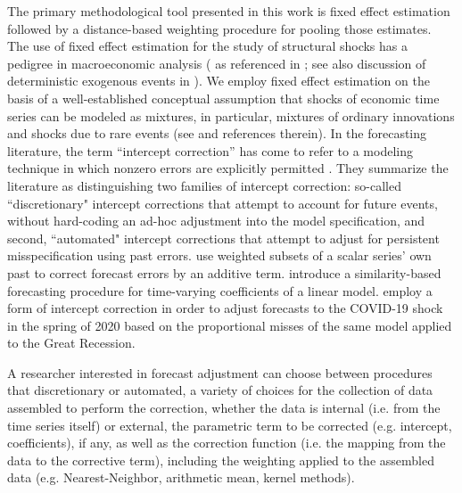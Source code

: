 \documentclass{uiucthesis2021}
\theoremstyle{definition}
\begin{document}
The primary methodological tool presented in this work is fixed effect estimation followed by a distance-based weighting procedure for pooling those estimates.  The use of fixed effect estimation for the study of structural shocks has a pedigree in macroeconomic analysis (\cite[][]{romer1989does} as referenced in \cite[][]{kilian2017structural}; see also discussion of deterministic exogenous events in \cite[][]{engle2001good}).  We employ fixed effect estimation on the basis of a well-established conceptual assumption that shocks of economic time series can be modeled as mixtures, in particular, mixtures of ordinary innovations and shocks due to rare events (see \cite[][]{phillips1996forecasting} and references therein).  In the forecasting literature, the term ``intercept correction'' has come to refer to a modeling technique in which nonzero errors are explicitly permitted \parencite[][]{hendry1994theory, clements1998forecasting}.  They summarize the literature as distinguishing two families of intercept correction: so-called ``discretionary" intercept corrections that attempt to account for future events, without hard-coding an ad-hoc adjustment into the model specification, and second, ``automated" intercept corrections that attempt to adjust for persistent misspecification using past errors.  \cite[][]{guerron2017macroeconomic} use weighted subsets of a scalar series' own past to correct forecast errors by an additive term. \cite[][]{dendramis2020similarity} introduce a similarity-based forecasting procedure for time-varying coefficients of a linear model. \cite[][]{foroni2022forecasting} employ a form of intercept correction in order to adjust forecasts to the COVID-19 shock in the spring of 2020 based on the proportional misses of the same model applied to the Great Recession.

A researcher interested in forecast adjustment can choose between procedures that discretionary or automated, a variety of choices for the collection of data assembled to perform the correction, whether the data is internal (i.e. from the time series itself) or external, the parametric term to be corrected (e.g. intercept, coefficients), if any, as well as the correction function (i.e. the mapping from the data to the corrective term), including the weighting applied to the assembled data (e.g. Nearest-Neighbor, arithmetic mean, kernel methods).
\end{document}
